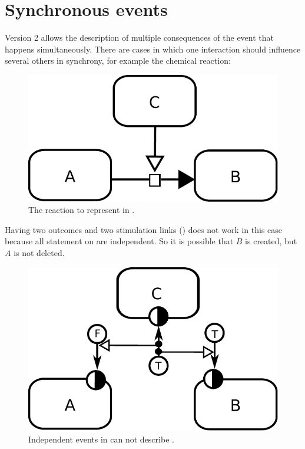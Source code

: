 \section{Synchronous events}\label{sec:syncev}

\SBGNERLone Version 2 allows the description of multiple consequences of the event that happens simultaneously. There are cases in which one interaction should influence several others in synchrony, for example the chemical reaction:

\begin{figure}[H]
  \centering
  \includegraphics[scale = 0.75]{images/synchronous-PD}
  \caption{The reaction to represent in \ER.}
  \label{fig:synchronousPD}
\end{figure}

Having two outcomes and two stimulation links () does not work in this case because all statement on \ERm are independent. So it is possible that  $B$ is created, but  $A$ is not deleted. 

\begin{figure}[H]
  \centering
  \includegraphics[scale = 0.75]{images/asynchronous}
  \caption{Independent events in \ER can not describe .}
  \label{fig:asynchronous}
\end{figure}

